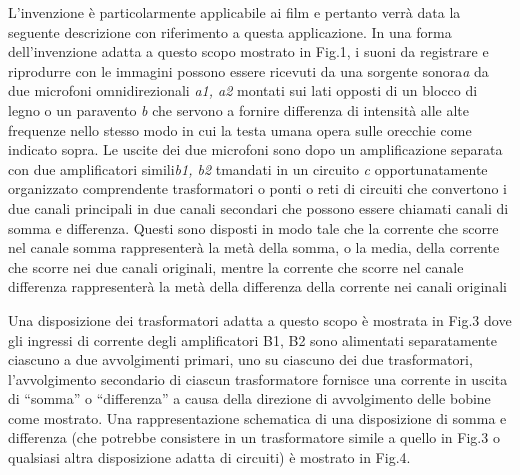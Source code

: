 \documentclass[11pt]{article}
\begin{document}
\begin{multicols*}{2}
L’invenzione è particolarmente applicabile ai film e pertanto verrà data la seguente descrizione con riferimento a questa applicazione. In una forma dell’invenzione adatta a questo scopo mostrato in Fig.1, i suoni da registrare e riprodurre con le immagini possono essere ricevuti da una sorgente sonora\textit{a} da due microfoni omnidirezionali \textit{a1, a2} montati sui lati opposti di un blocco di legno o un paravento \textit{b} che servono a fornire differenza di intensità alle alte frequenze nello stesso modo in cui la testa umana opera sulle orecchie come indicato sopra. Le uscite dei due microfoni sono dopo un amplificazione separata con due amplificatori simili\textit{b1, b2} tmandati in un circuito \textit{c} opportunatamente organizzato comprendente trasformatori o ponti o reti di circuiti che convertono i due canali principali in due canali secondari che possono essere chiamati canali di somma e differenza. Questi sono disposti in modo tale che la corrente che scorre nel canale somma rappresenterà la metà della somma, o la media, della corrente che scorre nei due canali originali, mentre la corrente che scorre nel canale differenza rappresenterà la metà della differenza della corrente nei canali originali
	
Una disposizione dei trasformatori adatta a questo scopo è mostrata in Fig.3 dove gli ingressi di corrente degli amplificatori B1, B2 sono alimentati separatamente ciascuno a due avvolgimenti primari, uno su ciascuno dei due trasformatori, l’avvolgimento secondario di ciascun trasformatore fornisce una corrente in uscita di “somma” o “differenza”  a causa della direzione di avvolgimento delle bobine come mostrato. Una rappresentazione schematica di una disposizione di somma e differenza (che potrebbe consistere in un trasformatore simile a quello in Fig.3 o qualsiasi altra disposizione adatta di circuiti) è mostrato in Fig.4.


\end{multicols*}
\end{document}
